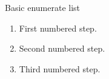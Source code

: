 \documentclass[14pt,t]{beamer}
\begin{document}
\begin{frame}{Basic enumerate list}
\begin{enumerate}
\item First numbered step.
\item Second numbered step.
\item Third numbered step.
\end{enumerate}
\end{frame}
\end{document}
